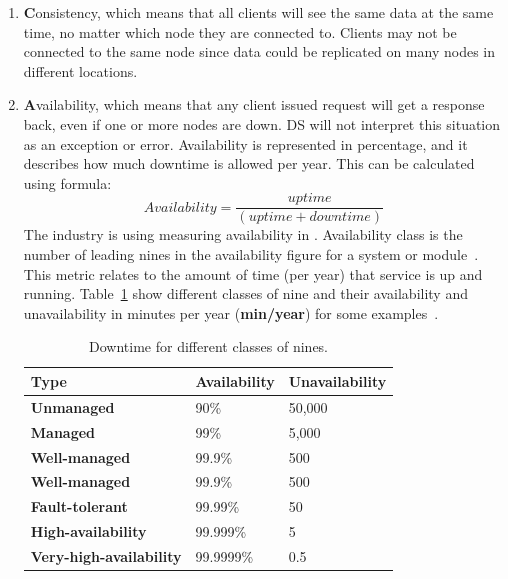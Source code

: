 \begin{enumerate} [start=1,label={(\bfseries \arabic*)}]
	\item \textbf{C}onsistency, which means that all clients will see the same data at the same time, no matter which node they are connected to. Clients may not be connected to the same node since data could be replicated on many nodes in different locations.
	\item \textbf{A}vailability, which means that any client issued request will get a response back, even if one or more nodes are down. DS will not interpret this situation as an exception or error. Availability is represented in percentage, and it describes how much downtime is allowed per year. This can be calculated using formula:\\ 
	
	\begin{equation}\label{eq:Availability}
		Availability = \frac{uptime}{ (uptime + downtime)}
	\end{equation}
	The industry is using measuring availability in . Availability class is the number of leading nines in the availability figure for a system or module~\cite{GrayS91}. This metric relates to the amount of time (per year) that service is up and running. Table~\ref{tab:table7} show different classes of nine and their availability and unavailability in minutes per year (\textbf{min/year}) for some examples~\cite{GrayS91}.
	
	\begin{table}[h!]
		\begin{center}
			\begin{tabular}{l|l|l}
				\textbf{Type} & \textbf{Availability} & \textbf{Unavailability} \\
				\hline
				\textbf{Unmanaged} & 90\% & 50,000 \\
				\textbf{Managed} & 99\% & 5,000 \\
				\textbf{Well-managed} & 99.9\% & 500 \\
				\textbf{Well-managed} & 99.9\% & 500 \\
				\textbf{Fault-tolerant} & 99.99\% & 50 \\
				\textbf{High-availability} & 99.999\% & 5 \\
				\textbf{Very-high-availability} & 99.9999\% & 0.5 \\
			\end{tabular}
		\end{center}
		\vspace{-0.5cm}
		\caption{Downtime for different classes of nines.}
		\label{tab:table7}
	\end{table}
	

\end{enumerate}
